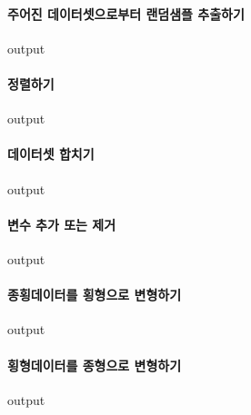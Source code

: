 \documentclass{report}
\begin{document}
\paragraph{주어진 데이터셋으로부터 랜덤샘플 추출하기}
\begin{Schunk}
\begin{Soutput}
output
\end{Soutput}
\end{Schunk}

\paragraph{정렬하기}
\begin{Schunk}
\begin{Soutput}
output
\end{Soutput}
\end{Schunk}

\paragraph{데이터셋 합치기}
\begin{Schunk}
\begin{Soutput}
output
\end{Soutput}
\end{Schunk}

\paragraph{변수 추가 또는 제거}
\begin{Schunk}
\begin{Soutput}
output
\end{Soutput}
\end{Schunk}

\paragraph{종횡데이터를 횡형으로 변형하기}
\begin{Schunk}
\begin{Soutput}
output
\end{Soutput}
\end{Schunk}

\paragraph{횡형데이터를 종형으로 변형하기}
\begin{Schunk}
\begin{Soutput}
output
\end{Soutput}
\end{Schunk}
\end{document}
